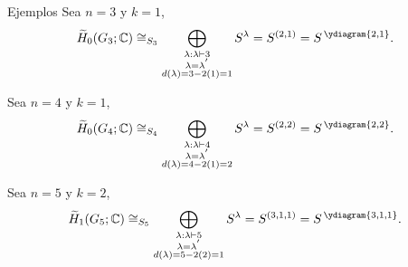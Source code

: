 \documentclass[final,xcolor=svgnames]{beamer}
\begin{document}
\begin{frame}{}
\begin{columns}
\begin{column}{0.5\textwidth}
        \begin{block}{Ejemplos} 
          Sea $n=3$ y $k=1$,
          \begin{equation*}
            \widetilde H_{0}(G_{3};\mathbb{C})\cong_{S_{3}}\bigoplus_{\substack{\lambda:\lambda\vdash 3\\
                \lambda=\lambda^{'}\\d(\lambda)=3-2(1)=1}} S^{\lambda}=S^{(2,1)}=S^{\,\ydiagram{2,1}}.
          \end{equation*}
          
          Sea $n=4$ y $k=1$,
          \begin{equation*}
            \widetilde H_{0}(G_{4};\mathbb{C})\cong_{S_{4}}\bigoplus_{\substack{\lambda:\lambda\vdash 4\\
                \lambda=\lambda^{'}\\d(\lambda)=4-2(1)=2}} S^{\lambda}=S^{(2,2)}=S^{\,\ydiagram{2,2}}.
          \end{equation*}

          Sea $n=5$ y $k=2$,
          \begin{equation*}
            \widetilde H_{1}(G_{5};\mathbb{C})\cong_{S_{5}}\bigoplus_{\substack{\lambda:\lambda\vdash 5\\
                \lambda=\lambda^{'}\\d(\lambda)=5-2(2)=1}} S^{\lambda}=S^{(3,1,1)}=S^{\,\ydiagram{3,1,1}}.
          \end{equation*}
        

\end{block}
\end{column}
\end{columns}
\end{frame}
\end{document}
